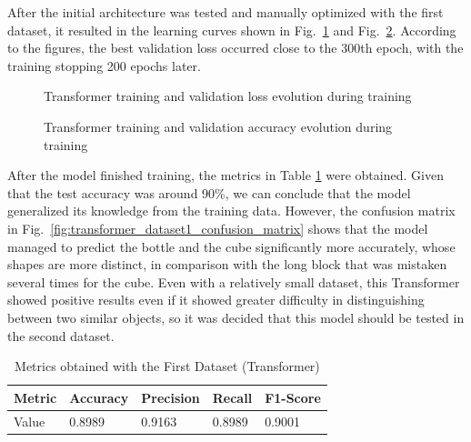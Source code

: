 After the initial architecture was tested and manually optimized with the first dataset, it resulted in the learning curves shown in Fig.~\ref{fig:transformer_dataset1_loss} and Fig.~\ref{fig:transformer_dataset1_acc}. According to the figures, the best validation loss occurred close to the 300th epoch, with the training stopping 200 epochs later.

\begin{figure}[H]
    \centering
    {\fontsize{10}{12}\selectfont}
    \caption[Transformer training and validation loss evolution during training]{Transformer training and validation loss evolution during training}
    \label{fig:transformer_dataset1_loss}
\end{figure}

\begin{figure}[H]
    \centering
    {\fontsize{10}{12}\selectfont}
    \caption[Transformer training and validation accuracy evolution during training]{Transformer training and validation accuracy evolution during training}
    \label{fig:transformer_dataset1_acc}
\end{figure}

After the model finished training, the metrics in Table \ref{table:transformer_dataset1_results} were obtained. Given that the test accuracy was around 90\%, we can conclude that the model generalized its knowledge from the training data. However, the confusion matrix in Fig.~\ref{fig:transformer_dataset1_confusion_matrix} shows that the model managed to predict the bottle and the cube significantly more accurately, whose shapes are more distinct, in comparison with the long block that was mistaken several times for the cube. Even with a relatively small dataset, this Transformer showed positive results even if it showed greater difficulty in distinguishing between two similar objects, so it was decided that this model should be tested in the second dataset.

\begin{table}[H]
    \centering
    \caption{Metrics obtained with the First Dataset (Transformer)}
    \label{table:transformer_dataset1_results}
    \begin{tabular}{|l|l|l|l|l|}
        \hline
        Metric & Accuracy & Precision & Recall & F1-Score \\
        \hline
        Value & 0.8989 & 0.9163 & 0.8989 & 0.9001 \\
        \hline
    \end{tabular}
\end{table}

